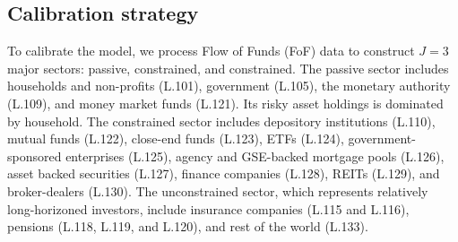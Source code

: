 \documentclass[12pt,english]{article}
\begin{document}
\subsection{Calibration strategy}
To calibrate the model, we process Flow of Funds (FoF) data to construct $J=3$ major sectors: passive, constrained, and constrained. The passive sector includes households and non-profits (L.101), government (L.105), the monetary authority (L.109), and money market funds (L.121). Its risky asset holdings is dominated by household. The constrained sector includes depository institutions (L.110), mutual funds (L.122), close-end funds (L.123), ETFs (L.124), government-sponsored enterprises (L.125), agency and GSE-backed mortgage pools (L.126), asset backed securities (L.127), finance companies (L.128), REITs (L.129), and broker-dealers (L.130). The unconstrained sector, which represents relatively long-horizoned investors, include insurance companies (L.115 and L.116), pensions (L.118, L.119, and L.120), and rest of the world (L.133). 



\end{document}
